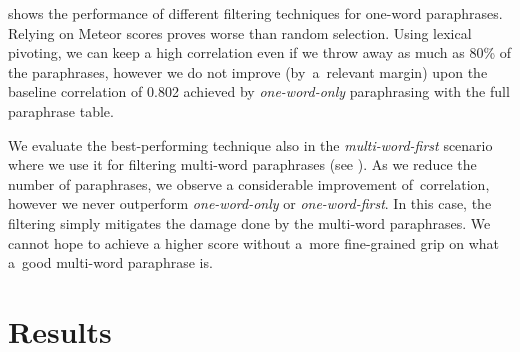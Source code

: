  shows the performance of different filtering
techniques for one-word paraphrases. Relying on Meteor scores proves worse than
random selection. Using lexical pivoting, we can keep a high correlation even 
if we throw away as much as 80\% of the paraphrases, however we do not improve
(by~a~relevant margin) upon the baseline correlation of 0.802 achieved by
\emph{one-word-only} paraphrasing with the full paraphrase table.

We evaluate the best-performing technique also in the \textit{multi-word-first}
scenario where we use it for filtering multi-word paraphrases (see
). As we reduce the number of paraphrases, we observe a
considerable improvement of~correlation, however we never outperform
\textit{one-word-only} or \textit{one-word-first}. In this case, the filtering
simply mitigates the damage done by the multi-word paraphrases. We
cannot hope to achieve a higher score without a~more fine-grained grip on what
a~good multi-word paraphrase is.

\section{Results}
\label{results}

